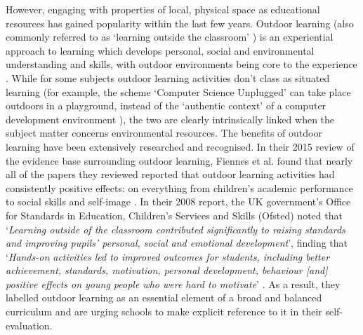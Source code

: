 However, engaging with properties of local, physical space as educational resources has gained popularity within the last few years. Outdoor learning (also commonly referred to as ‘learning outside the classroom’ \citep{Lotc.org2006}) is an experiential approach to learning which develops personal, social and environmental understanding and skills, with outdoor environments being core to the experience \citep{Harvey2012}. While for some subjects outdoor learning activities don't class as situated learning (for example, the scheme  `Computer Science Unplugged' can take place outdoors in a playground, instead of the `authentic context' of a computer development environment \citep{Bell2009}), the two are clearly intrinsically linked when the subject matter concerns environmental resources. The benefits of outdoor learning have been extensively researched and recognised. In their 2015 review of the evidence base surrounding outdoor learning, Fiennes et al. found that nearly all of the papers they reviewed reported that outdoor learning activities had consistently positive effects: on everything from children's academic performance to social skills and self-image \citep{Fiennes2015}. In their 2008 report, the UK government's Office for Standards in Education, Children's Services and Skills (Ofsted) noted that `\textit{Learning outside of the classroom contributed significantly to raising standards and improving pupils’ personal, social and emotional development}', finding that `\textit{Hands-on activities led to improved outcomes for students, including better achievement, standards, motivation, personal development, behaviour [and] positive effects on young people who were hard to motivate}' \citep{Ofsted2008}. As a result, they labelled outdoor learning as an essential element of a broad and balanced curriculum and are urging schools to make explicit reference to it in their self-evaluation.

